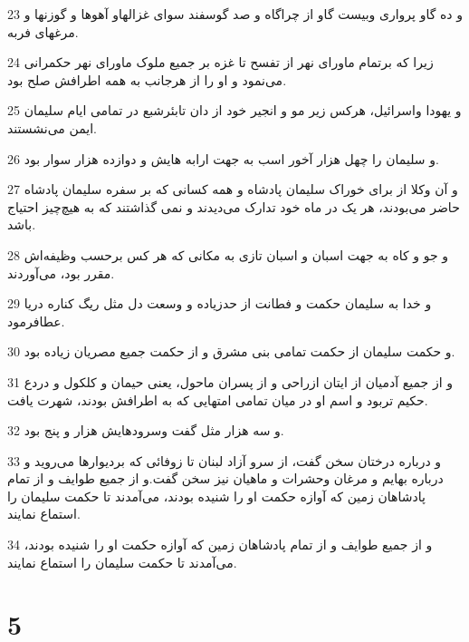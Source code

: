 \par 23 و ده گاو پرواری وبیست گاو از چراگاه و صد گوسفند سوای غزالهاو آهوها و گوزنها و مرغهای فربه.
\par 24 زیرا که برتمام ماورای نهر از تفسح تا غزه بر جمیع ملوک ماورای نهر حکمرانی می‌نمود و او را از هرجانب به همه اطرافش صلح بود.
\par 25 و یهودا واسرائیل، هرکس زیر مو و انجیر خود از دان تابئرشبع در تمامی ایام سلیمان ایمن می‌نشستند.
\par 26 و سلیمان را چهل هزار آخور اسب به جهت ارابه هایش و دوازده هزار سوار بود.
\par 27 و آن وکلا از برای خوراک سلیمان پادشاه و همه کسانی که بر سفره سلیمان پادشاه حاضر می‌بودند، هر یک در ماه خود تدارک می‌دیدند و نمی گذاشتند که به هیچ‌چیز احتیاج باشد.
\par 28 و جو و کاه به جهت اسبان و اسبان تازی به مکانی که هر کس بر‌حسب وظیفه‌اش مقرر بود، می‌آوردند.
\par 29 و خدا به سلیمان حکمت و فطانت از حدزیاده و وسعت دل مثل ریگ کناره دریا عطافرمود.
\par 30 و حکمت سلیمان از حکمت تمامی بنی مشرق و از حکمت جمیع مصریان زیاده بود.
\par 31 و از جمیع آدمیان از ایتان ازراحی و از پسران ماحول، یعنی حیمان و کلکول و دردع حکیم تربود و اسم او در میان تمامی امتهایی که به اطرافش بودند، شهرت یافت.
\par 32 و سه هزار مثل گفت وسرودهایش هزار و پنج بود. 
\par 33 و درباره درختان سخن گفت، از سرو آزاد لبنان تا زوفائی که بردیوارها می‌روید و درباره بهایم و مرغان وحشرات و ماهیان نیز سخن گفت.و از جمیع طوایف و از تمام پادشاهان زمین که آوازه حکمت او را شنیده بودند، می‌آمدند تا حکمت سلیمان را استماع نمایند.
\par 34 و از جمیع طوایف و از تمام پادشاهان زمین که آوازه حکمت او را شنیده بودند، می‌آمدند تا حکمت سلیمان را استماع نمایند.
 
\chapter{5}


